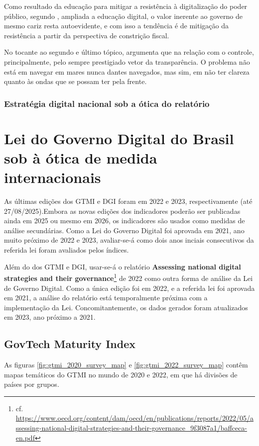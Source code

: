Como resultado da educação para mitigar a resistência à digitalização do poder público, segundo \cite{do2022governo}, ampliada a educação digital, o valor inerente ao governo de mesmo cariz resta autoevidente, e com isso a tendência é de mitigação da resistência a partir da perspectiva de constrição fiscal.

No tocante ao segundo e último tópico, \cite{do2022governo} argumenta que na relação com o controle, principalmente, pelo sempre prestigiado vetor da transparência. O problema não está em navegar em mares nunca dantes navegados, mas sim, em não ter clareza quanto às ondas que se possam ter pela frente.

\subsubsection{Estratégia digital nacional sob a ótica do relatório }

\section{Lei do Governo Digital do Brasil sob à ótica de medida internacionais}

As últimas edições dos GTMI e DGI foram em 2022 e 2023, respectivamente (até 27/08/2025).Embora as novas edições dos indicadores poderão ser publicadas ainda em 2025 ou mesmo em 2026, os indicadores são usados como medidas de análise secundárias. Como a Lei do Governo Digital foi aprovada em 2021, ano muito próximo de 2022 e 2023, avaliar-se-á como dois anos inciais consecutivos da referida lei foram avaliados pelos índices.

Além do dos GTMI e DGI, usar-se-á o relatório \textbf{Assessing national digital strategies and their governance}\footnote{cf. \url{https://www.oecd.org/content/dam/oecd/en/publications/reports/2022/05/assessing-national-digital-strategies-and-their-governance_9f3087a1/baffceca-en.pdf}} de 2022 como outra forma de análise da Lei de Governo Digital. Como a única edição foi em 2022, e a referida lei foi aprovada em 2021, a análise do relatório está temporalmente próxima com a implementação da Lei. Concomitantemente, os dados gerados foram atualizados em 2023, ano próximo a 2021.

\subsection{GovTech Maturity Index}

As figuras \ref{fig:gtmi_2020_survey_map} e \ref{fig:gtmi_2022_survey_map} contêm mapas temáticos do GTMI no mundo de 2020 e 2022, em que há divisões de países por grupos.


